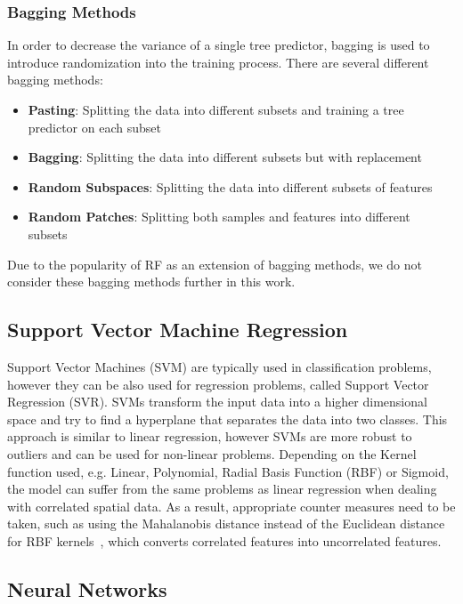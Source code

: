 \subsubsection{Bagging Methods}

In order to decrease the variance of a single tree predictor, bagging is used to introduce randomization into the training process. There are several different bagging methods:

\begin{itemize}
    \item \textbf{Pasting}: Splitting the data into different subsets and training a tree predictor on each subset~\cite{breiman1999pasting}
    \item \textbf{Bagging}: Splitting the data into different subsets but with replacement~\cite{breiman1996bagging}
    \item \textbf{Random Subspaces}: Splitting the data into different subsets of features~\cite{ho1998random}
    \item \textbf{Random Patches}: Splitting both samples and features into different subsets~\cite{louppe2012ensembles}
\end{itemize}

Due to the popularity of RF as an extension of bagging methods, we do not consider these bagging methods further in this work.

\subsection{Support Vector Machine Regression}

Support Vector Machines (SVM) are typically used in classification problems, however they can be also used for regression problems, called Support Vector Regression (SVR). SVMs transform the input data into a higher dimensional space and try to find a hyperplane that separates the data into two classes. This approach is similar to linear regression, however SVMs are more robust to outliers and can be used for non-linear problems. Depending on the Kernel function used, e.g. Linear, Polynomial, Radial Basis Function (RBF) or Sigmoid, the model can suffer from the same problems as linear regression when dealing with correlated spatial data.
As a result, appropriate counter measures need to be taken, such as using the Mahalanobis distance instead of the Euclidean distance for RBF kernels~\cite{kamada2006support}, which converts correlated features into uncorrelated features.

\subsection{Neural Networks}

